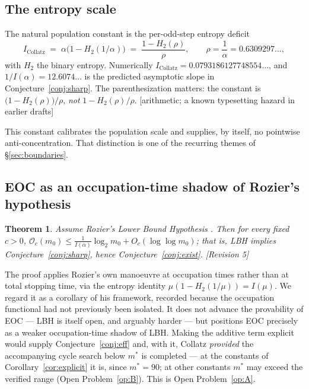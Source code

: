 \documentclass[11pt]{article}
\theoremstyle{plain}
\newtheorem{theorem}{Theorem}[section]
\theoremstyle{definition}
\theoremstyle{remark}
\newcommand{\Occ}{\mathcal{O}}
\newcommand{\al}{\alpha}
\newcommand{\status}[1]{\textsf{\footnotesize[#1]}}
\begin{document}
\subsection{The entropy scale}\label{sec:entropy}

The natural population constant is the per-odd-step entropy deficit
\[
I_{\mathrm{Collatz}}\;=\;\al\bigl(1-H_2(1/\al)\bigr)\;=\;\frac{1-H_2(\rho)}{\rho},
\qquad \rho=\frac{1}{\al}=0.6309297\ldots,
\]
with $H_2$ the binary entropy. Numerically $I_{\mathrm{Collatz}}=0.0793186127748554\ldots$, and
$1/I(\al)=12.6074\ldots$ is the predicted asymptotic slope in Conjecture~\ref{conj:sharp}. The
parenthesization matters: the constant is $\bigl(1-H_2(\rho)\bigr)/\rho$, \emph{not}
$1-H_2(\rho)/\rho$. \status{arithmetic; a known typesetting hazard in earlier drafts}

This constant calibrates the population scale and supplies, by itself, no pointwise
anti-concentration. That distinction is one of the recurring themes of \S\ref{sec:boundaries}.

\subsection{EOC as an occupation-time shadow of Rozier's hypothesis}\label{sec:rozier}

\begin{theorem}\label{thm:rozier}
Assume Rozier's Lower Bound Hypothesis \cite[Hyp.~2.3]{Rozier}. Then for every fixed $c>0$,
$\Occ_c(m_0)\le \frac{1}{I(\al)}\log_2 m_0+O_c(\log\log m_0)$; that is, LBH implies
Conjecture~\ref{conj:sharp}, hence Conjecture~\ref{conj:exist}. \status{Revision 5}
\end{theorem}

The proof applies Rozier's own manoeuvre \cite[Thm.~4.1]{Rozier} at occupation times rather than at
total stopping time, via the entropy identity $\mu(1-H_2(1/\mu))=I(\mu)$. We regard it as a
corollary of his framework, recorded because the occupation functional had not previously been
isolated. It does not advance the provability of EOC --- LBH is itself open, and arguably harder ---
but positions EOC precisely as a weaker occupation-time shadow of LBH. Making the additive term
explicit would supply Conjecture~\ref{conj:eff} and, with it, Collatz \emph{provided} the
accompanying cycle search below $m^*$ is completed --- at the constants of
Corollary~\ref{cor:explicit} it is, since $m^*=90$; at other constants $m^*$ may exceed the
verified range (Open Problem~\ref{op:B}). This is Open Problem~\ref{op:A}.
\end{document}
